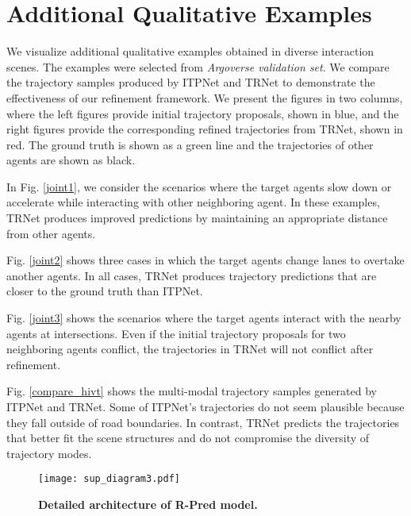 \documentclass[10pt,twocolumn,letterpaper]{article}
\begin{document}
\linespread{1.0}

\section{Additional Qualitative Examples}
We visualize additional qualitative examples obtained in diverse interaction scenes. The examples were selected from \textit{Argoverse validation set}. We compare the trajectory samples produced by ITPNet and TRNet to demonstrate the effectiveness of our refinement framework. We present the figures in two columns, where the left figures provide  initial trajectory proposals, shown in blue, and the right figures provide the corresponding refined trajectories from TRNet, shown in red. The ground truth is shown as a green line and the trajectories of other agents are shown as black.

 In Fig. \ref{joint1},  we consider the scenarios where the target agents slow down or accelerate while interacting with other neighboring agent. 
  In these examples, TRNet produces improved predictions by maintaining an appropriate distance from other agents.
  
 Fig. \ref{joint2} shows three cases in which the target agents change lanes to overtake another agents. In all cases, TRNet produces trajectory predictions that are closer to the ground truth than ITPNet. 

 Fig. \ref{joint3} shows the scenarios where the target agents interact with the nearby agents at intersections. 
Even if the initial trajectory proposals for two neighboring agents conflict, the trajectories in TRNet will not conflict after refinement.

 Fig. \ref{compare_hivt} shows the multi-modal trajectory samples generated by ITPNet and TRNet.  Some of ITPNet's trajectories do not seem plausible because they fall outside of road boundaries. In contrast, TRNet predicts the trajectories that better fit the scene structures and do not compromise the diversity of trajectory modes.



\begin{figure*} [ht]
\centering  
\texttt{[image: sup\_diagram3.pdf]}
\caption{\textbf{Detailed architecture of R-Pred model.} }
\label{refine_detail}  
\end{figure*}
\end{document}
